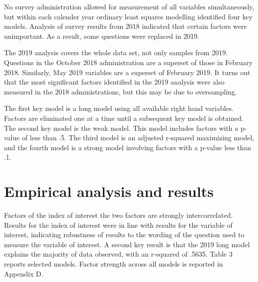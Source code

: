 \documentclass[AER]{./aea-latex-templates/AEA}
\begin{document}
        No survey administration allowed for measurement of all variables simultaneously,
        but within each calender year ordinary least squares modelling identified four key models.
        Analysis of survey results from 2018 indicated that certain factors were unimportant.
        As a result, some questions were replaced in 2019.

        The 2019 analysis covers the whole data set, not only samples from 2019.
        Questions in the October 2018 administration are a superset of those in February 2018.
        Similarly, May 2019 variables are a superset of February 2019.
        It turns out that the most significant factors identified in the
        2019 analysis were also measured in the 2018 administrations, but this may be due to oversampling.
        
        The first key model is a long model using all available right hand variables.
        Factors are eliminated one at a time until a subsequent key model is obtained.
        The second key model is the weak model. This model includes factors with a p-value of less than .5.
        The third model is an adjusted r-squared maximizing model, and the fourth
        model is a strong model involving factors with a p-value less than .1.

        \section{Empirical analysis and results}
        
        Factors of the index of interest the two factors
        are strongly intercorrelated. Results for the index of interest were in line
        with results for the variable of interest, indicating robustness of results
        to the wording of the question used to measure the variable of interest.
        A second key result is that the 2019 long model explains the majority of data observed, with an r-squared of .5635.
        Table 3 reports selected models. Factor strength across all models is reported in Appendix D.
        
\end{document}
